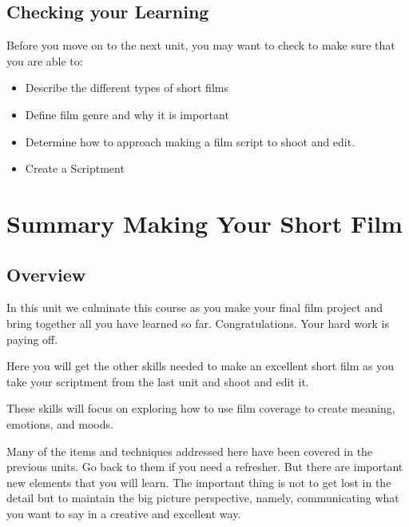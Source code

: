 \documentclass[
]{book}
\providecommand{\tightlist}{%
  \setlength{\itemsep}{0pt}\setlength{\parskip}{0pt}}
\begin{document}
\hypertarget{checking-your-learning-7}{%
\section*{Checking your Learning}\label{checking-your-learning-7}}

\begin{progress}
Before you move on to the next unit, you may want to check to make sure that you are able to:

\begin{itemize}
\tightlist
\item
  Describe the different types of short films\\
\item
  Define film genre and why it is important\\
\item
  Determine how to approach making a film script to shoot and edit.\\
\item
  Create a Scriptment
\end{itemize}
\end{progress}

\hypertarget{summary-making-your-short-film}{%
\chapter{Summary Making Your Short Film}\label{summary-making-your-short-film}}

\hypertarget{overview-8}{%
\section*{Overview}\label{overview-8}}

In this unit we culminate this course as you make your final film project and bring together all you have learned so far. Congratulations. Your hard work is paying off.

Here you will get the other skills needed to make an excellent short film as you take your scriptment from the last unit and shoot and edit it.

These skills will focus on exploring how to use film coverage to create meaning, emotions, and moods.

Many of the items and techniques addressed here have been covered in the previous units. Go back to them if you need a refresher. But there are important new elements that you will learn. The important thing is not to get lost in the detail but to maintain the big picture perspective, namely, communicating what you want to say in a creative and excellent way.
\end{document}
